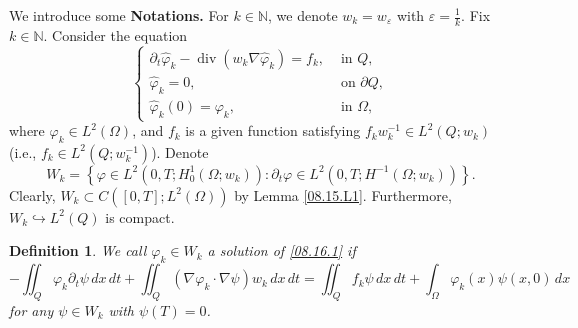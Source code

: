 \documentclass[11pt]{article}
\newtheorem{definition}{Definition}[section]
\numberwithin{equation}{section}
\def\pt{\partial}
\def\e{\varepsilon}
\def\vp{\varphi}
\def\pt{\partial}
\def\Om{\Omega}
\def\wh{\widehat}
\DeclareMathOperator{\Div}{div}
\newcommand{\N}{\mathbb N}
\begin{document}
We introduce some \textbf{Notations.} For $k \in \N$, we denote $w_k = w_\e$ with $\e = \frac{1}{k}$.
Fix $k \in \N$. Consider the equation
\begin{equation}\label{08.16.1}
\begin{cases}
\pt_t\wh \vp_k - \Div(w_k\nabla\wh \vp_k) = f_k, &\text{ in } Q, \\
\wh \vp_k = 0, &\text{ on } \pt Q, \\
\wh \vp_k(0) = \vp_k, & \text{ in } \Om,
\end{cases}
\end{equation}
where $\vp_k \in L^2(\Om)$, and $f_k$ is a given function satisfying $f_kw_k^{-1} \in L^2(Q; w_k)$ (i.e., $f_k \in L^2(Q; w_k^{-1})$).
Denote
\begin{equation*}
W_k = \left\{\vp \in L^2(0,T; H_{0}^1(\Om; w_k)) \colon \pt_t\vp \in L^2(0,T; H^{-1}(\Om; w_k))\right\}.
\end{equation*}
Clearly, $W_k \subset C([0,T]; L^2(\Om))$ by Lemma \ref{08.15.L1}. Furthermore, $W_k \hookrightarrow L^2(Q)$ is compact.
\begin{definition}\label{08.16.D1}
We call $\vp_k \in W_k$ a solution of \eqref{08.16.1} if
\begin{equation*}
-\iint_Q\vp_k\pt_t\psi \, dx \, dt + \iint_Q\left(\nabla \vp_k \cdot \nabla \psi\right)w_k \, dx \, dt = \iint_Q f_k\psi \, dx \, dt + \int_\Om \vp_k(x)\psi(x,0) \, dx
\end{equation*}
for any $\psi \in W_k$ with $\psi(T) = 0$.
\end{definition}
\end{document}
